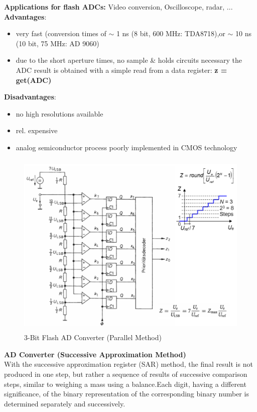 \textbf{Applications for flash ADCs:} Video conversion, Oscilloscope, radar, ...\\

\textbf{Advantages}: 

\begin{itemize}
\item  very fast (conversion times of $\mathrm{\sim}$ 1 ns (8 bit, 600 MHz: TDA8718),or $\mathrm{\sim}$ 10 ns (10 bit, 75 MHz: AD 9060)
\item  due to the short aperture times, no sample \& holds circuits necessary the ADC result is obtained with a simple read from a data register: \textbf{z = get(ADC)}
\end{itemize}

\textbf{Disadvantages}:

\begin{itemize}
\item  no high resolutions available
\item  rel. expensive 
\item  analog semiconductor process  poorly implemented in CMOS technology
\end{itemize}

    \begin{figure}[h]
    \centering
    \includegraphics[width=15cm, height=9cm]{Images/image175.png}
    \caption{3-Bit Flash AD Converter (Parallel Method)}
    \label{fig:Fig }
    \end{figure}

{\rot\bf AD Converter (Successive Approximation Method)}\\

With the successive approximation register (SAR) method, the final result is not produced in one step, but rather a sequence of results of successive comparison steps, similar to weighing a mass using a balance.Each digit, having a different significance, of the binary representation of the corresponding binary number is determined separately and successively.\\

